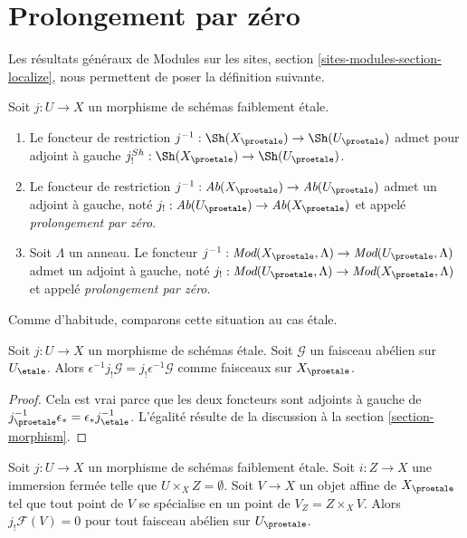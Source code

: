 \section{Prolongement par zéro}
\label{section-extension-by-zero}

\noindent
Les résultats généraux de
Modules sur les sites, section \ref{sites-modules-section-localize},
nous permettent de poser la définition suivante.

\begin{definition}
\label{definition-extension-zero}
Soit $j : U \to X$ un morphisme de schémas faiblement \'etale.
\begin{enumerate}
\item Le foncteur de restriction
$j^{-1} : \Sh(X_\proetale) \to \Sh(U_\proetale)$
admet pour adjoint à gauche
$j_!^{Sh} : \Sh(X_\proetale) \to \Sh(U_\proetale)$.
\item Le foncteur de restriction
$j^{-1} : \textit{Ab}(X_\proetale) \to \textit{Ab}(U_\proetale)$
admet un adjoint à gauche, noté
$j_! : \textit{Ab}(U_\proetale) \to \textit{Ab}(X_\proetale)$
et appelé {\it prolongement par zéro}.
\item Soit $\Lambda$ un anneau. Le foncteur
$j^{-1} : \textit{Mod}(X_\proetale, \Lambda) \to
\textit{Mod}(U_\proetale, \Lambda)$
admet un adjoint à gauche, noté
$j_! : \textit{Mod}(U_\proetale, \Lambda) \to
\textit{Mod}(X_\proetale, \Lambda)$
et appelé {\it prolongement par zéro}.
\end{enumerate}
\end{definition}

\noindent
Comme d'habitude, comparons cette situation au cas \'etale.

\begin{lemma}
\label{lemma-jshriek-comparison}
Soit $j : U \to X$ un morphisme de schémas \'etale.
Soit $\mathcal{G}$ un faisceau abélien sur $U_\etale$.
Alors $\epsilon^{-1} j_!\mathcal{G} = j_!\epsilon^{-1}\mathcal{G}$
comme faisceaux sur $X_\proetale$.
\end{lemma}

\begin{proof}
Cela est vrai parce que les deux foncteurs sont adjoints à gauche de
$j_\proetale^{-1} \epsilon_* = \epsilon_* j_\etale^{-1}$.
L'égalité résulte de la discussion à la section \ref{section-morphism}.
\end{proof}

\begin{lemma}
\label{lemma-jshriek-zero}
Soit $j : U \to X$ un morphisme de schémas faiblement \'etale.
Soit $i : Z \to X$ une immersion fermée telle que $U \times_X Z = \emptyset$.
Soit $V \to X$ un objet affine de $X_\proetale$ tel que tout point
de $V$ se spécialise en un point de $V_Z = Z \times_X V$.
Alors $j_!\mathcal{F}(V) = 0$ pour tout faisceau abélien sur $U_\proetale$.
\end{lemma}

